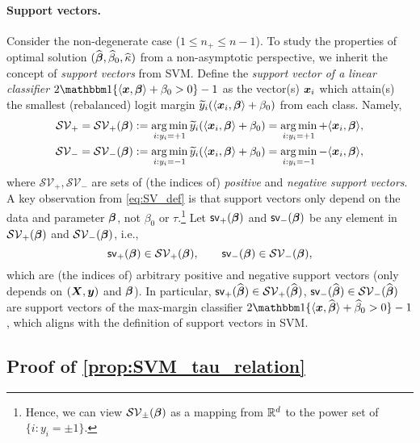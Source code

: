 \paragraph{Support vectors.} Consider the non-degenerate case ($1 \le n_+ \le n - 1$). To study the properties of optimal solution $(\widehat{{\boldsymbol{\beta}}}, \widehat\beta_0, \widehat\kappa)$ from a non-asymptotic perspective, we inherit the concept of \emph{support vectors} from SVM. Define the \emph{support vector of a linear classifier} $2\ind\{ \< \xx, \vbeta \> + \beta_0 > 0 \} -1$ as the vector(s) $\text{\boldmath $x$}_i$ which attain(s) the smallest (rebalanced) logit margin $\widetilde y_i(\langle \text{\boldmath $x$}_i, {\boldsymbol{\beta}} \rangle + \beta_0)$ from each class. Namely,
\begin{equation}\label{eq:SV_def}
	\begin{aligned}
		\mathcal{SV}_+ = \mathcal{SV}_+({\boldsymbol{\beta}}) & :=  \operatorname*{arg\,min}_{i: y_i = +1} \widetilde y_i(\langle \text{\boldmath $x$}_i, {\boldsymbol{\beta}} \rangle + \beta_0)
	= \operatorname*{arg\,min}_{i: y_i = +1} + \langle \text{\boldmath $x$}_i, {\boldsymbol{\beta}} \rangle, \\
		\mathcal{SV}_- = \mathcal{SV}_-({\boldsymbol{\beta}}) & :=  \operatorname*{arg\,min}_{i: y_i = -1} \widetilde y_i(\langle \text{\boldmath $x$}_i, {\boldsymbol{\beta}} \rangle + \beta_0)
	= \operatorname*{arg\,min}_{i: y_i = -1} - \langle \text{\boldmath $x$}_i, {\boldsymbol{\beta}} \rangle, \\
	\end{aligned}
\end{equation}
where $\mathcal{SV}_+, \mathcal{SV}_-$ are sets of (the indices of) \emph{positive} and \emph{negative support vectors}. A key observation from \cref{eq:SV_def} is that support vectors only depend on the data and parameter ${\boldsymbol{\beta}}$, not $\beta_0$ or $\tau$.\footnote{Hence, we can view $\mathcal{SV}_\pm({\boldsymbol{\beta}})$ as a mapping from $\mathbb{R}^d$ to the power set of $\{i: y_i = \pm 1\}$.} Let $\mathsf{sv}_+({\boldsymbol{\beta}})$ and $\mathsf{sv}_-({\boldsymbol{\beta}})$ be any element in $\mathcal{SV}_+({\boldsymbol{\beta}})$ and $\mathcal{SV}_-({\boldsymbol{\beta}})$, i.e.,
\begin{equation*}
	\mathsf{sv}_+({\boldsymbol{\beta}}) \in \mathcal{SV}_+({\boldsymbol{\beta}}),
	\qquad
	\mathsf{sv}_-({\boldsymbol{\beta}}) \in \mathcal{SV}_-({\boldsymbol{\beta}}),
\end{equation*} 
which are (the indices of) arbitrary positive and negative support vectors (only depends on $(\text{\boldmath $X$}, \text{\boldmath $y$})$ and ${\boldsymbol{\beta}}$). In particular, $\mathsf{sv}_+(\widehat{{\boldsymbol{\beta}}}) \in \mathcal{SV}_+(\widehat{{\boldsymbol{\beta}}})$, $\mathsf{sv}_-(\widehat{{\boldsymbol{\beta}}}) \in \mathcal{SV}_-(\widehat{{\boldsymbol{\beta}}})$ are support vectors of the max-margin classifier $2 \ind\{\< \xx, \hat\vbeta \> + \hat\beta_0 > 0\} - 1$, which aligns with the definition of support vectors in SVM.

\subsection{Proof of \cref{prop:SVM_tau_relation}}

